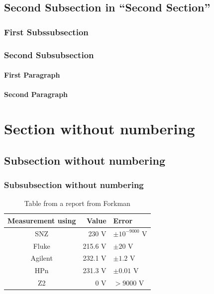 \subsection{Second Subsection in ``Second Section''}

\subsubsection{First Subssubsection}

\subsubsection{Second Subsubsection}

\paragraph{First Paragraph}

\paragraph{Second Paragraph}


\section*{Section without numbering}

\subsection*{Subsection without numbering}

\subsubsection*{Subsubsection without numbering}
\begin{table}[H]
    \centering  
    \begin{tabular}{||c|r|l||}
        \hline 
        \textbf{Measurement using} & \textbf{Value} & \textbf{Error}\\ 
        \hline 
        SNZ  & 230 V & $\pm10^{-9000}$ V \\
        \hline
        Fluke & 215.6 V & $\pm20$ V \\
        \hline 
        Agilent & 232.1 V  & $\pm1.2$ V \\
        \hline 
        HPn & 231.3 V& $\pm0.01$ V \\
        \hline
        Z2 & 0 V & $>9000$ V \\
        \hline
        \end{tabular}
    \caption{Table from a report from Forkman}
    \label{Forkman_Mätning}
\end{table}


